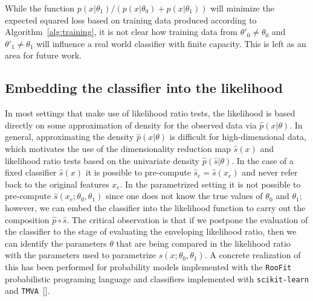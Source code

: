 \documentclass[aoas,preprint]{imsart}
\newcommand{\citek}[1]{[\cite{#1}]}
\numberwithin{equation}{section}
\theoremstyle{plain}
\begin{document}
While the function $p(x|\theta_1)/(p(x|\theta_0)+p(x|\theta_1))$ will minimize the expected squared loss based on 
training data produced according to Algorithm~\ref{alg:training}, it is not clear how training data from $\theta'_0 \ne \theta_0$ and $\theta'_1 \ne \theta_1$ will influence a real world classifier with finite capacity. This is left as an area for future work.

\subsection{Embedding the classifier into the likelihood}

In most settings that make use of likelihood ratio tests, the likelihood is based directly on some approximation of density for the observed data via $\hat{p}(x|\theta)$.  In general, approximating the density $\hat{p}(x|\theta)$ is difficult for high-dimensional data, which motivates the use of the dimensionality reduction map $\hat{s}(x)$ and likelihood ratio tests based on the univariate density $\hat{p}(\hat{s}|\theta)$.  In the case of a fixed classifier $\hat s(x)$ it is possible to pre-compute $\hat s_e=\hat s(x_e)$ and never refer back to the original features $x_e$. In the parametrized setting it is not possible to pre-compute $\hat s(x_e; \theta_0, \theta_1)$ since one does not know the true values of  $\theta_0$ and $\theta_1$; however, we can  embed the classifier into the likelihood function to carry out the composition $\hat{p}\circ \hat{s}$. The critical observation is that  if we postpone the evaluation of the classifier to the stage of evaluating the enveloping likelihood ratio, then we can identify the parameters $\theta$ that are being compared in the likelihood ratio with the parameters used to parametrize $s(x;\theta_0, \theta_1)$.  A concrete realization of this has been performed for probability models implemented with the \texttt{RooFit} probabilistic programing language and  classifiers implemented with \texttt{scikit-learn} and \texttt{TMVA}~\citek{Verkerke:2003ir,scikit-learn,Hocker:2007ht}.
\end{document}
